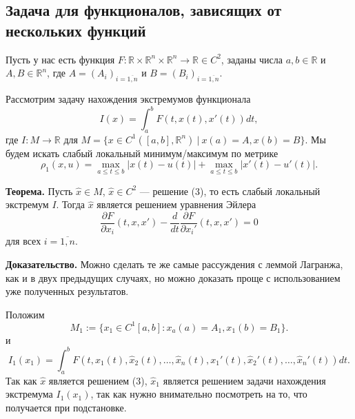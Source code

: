 


\subsection{Задача для функционалов, зависящих от нескольких функций}
Пусть у нас есть функция $F: \mathbb R \times \mathbb R^n \times \mathbb R^n \to \mathbb R \in C^2$, заданы числа $a, b \in \mathbb R$ и $A, B \in \mathbb R^n$, где $A = (A_i)_{i = \overline{1, n}}$ и $B = (B_i)_{i = \overline{1, n}}$.

Рассмотрим задачу нахождения экстремумов функционала
\begin{equation}
    I(x) = \int_a^b F(t, x(t), x'(t)) dt,
\end{equation}
где $I: M \to \mathbb R$ для $M = \{x \in C^1([a, b], \mathbb R^n)~|~x(a) = A, x(b) = B\}$.
Мы будем искать слабый локальный минимум/максимум по метрике
\[
    \rho_1(x, u) = \max_{a \le t \le b} |x(t) - u(t)| + \max_{a \le t \le b}|x'(t) - u'(t)|.
\]

\textbf{Теорема.} Пусть $\widehat x \in M$, $\widehat x \in C^2$ --- решение (3), то есть слабый локальный экстремум $I$.
Тогда $\widehat x$ является решением уравнения Эйлера
\[
    \frac{\partial F}{\partial x_i}(t, x, x') - \frac{d}{dt} \frac{\partial F}{\partial x_i'}(t, x, x') = 0
\]
для всех $i = \overline{1, n}$.

\textbf{Доказательство.} Можно сделать те же самые рассуждения с леммой Лагранжа, как и в двух предыдущих случаях, но можно доказать проще с использованием уже полученных результатов.

Положим
\[
    M_1 := \{x_1 \in C^1[a, b]: x_a(a) = A_1, x_1(b) = B_1\}.
\]
и
\[
    I_1(x_1) = \int_a^b F(t, x_1(t), \widehat x_2(t), \dots, \widehat x_n(t), x_1'(t), \widehat x_2'(t), \dots, \widehat x_n'(t)) dt.
\]
Так как $\widehat x$ является решением (3), $\widehat x_1$ является решением задачи нахождения экстремума $I_1(x_1)$, так как нужно внимательно посмотреть на то, что получается при подстановке.

